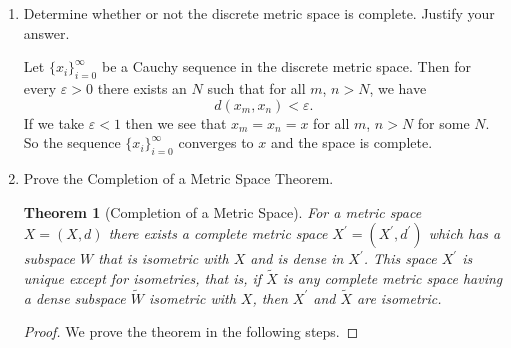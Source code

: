 \documentclass[12pt]{article}
\newtheorem{thm}{Theorem}
\begin{document}
\begin{enumerate}
\begin{mybox}
    \vspace*{3mm}
    Now, for every $g\in C[0,1]$, we have
    $$d(f_n,g)=\int_{-1}^1{|f_n(t) - g(t)|} dt
    = \int_{-1}^{-\frac{1}{n}}{|-1-g(t)|dt}
    + \int_{-\frac{1}{n}}^{\frac{1}{n}}
    {|f_n(t)-g(t)|dt}
    + \int_{{\frac{1}{n}}}^1{|1-g(t)|dt}$$
    Since $d\geq 0$ for all $g\in C[0,1]$,
    $d(f_n,g)\to 0$ implies that each
    integral on the right should also approach
    0. Then we should have
    $$g(t)=-1\ \ \text{ for }t\in [-1,0)
    \ \ \text{ and }\ \
    g(t)=1\ \ \text{ for }t\in (0,1].$$
    But then $g$ cannot be continuous so we have
    a contradiction. So, the Cauchy sequence
    $\{f_n\}_1^\infty$ does not converge in
    $C[0,1]$ and the space is not complete.
\end{mybox}
 
\item Determine whether or not the discrete metric
    space is complete. Justify your answer.
\begin{mybox}

    Let $\{x_i\}_{i=0}^\infty$ be a Cauchy
    sequence in the discrete metric space. Then
    for every $\varepsilon>0$ there exists an $N$
    such that for all $m$, $n>N$, we have
    $$d(x_m,x_n)<\varepsilon.$$
    If we take $\varepsilon<1$ then we see that
    $x_m=x_n=x$ for all $m$, $n>N$ for some $N$.
    So the sequence $\{x_i\}_{i=0}^\infty$
    converges to $x$ and the space is
    complete.
\end{mybox}
 
\item Prove the Completion of a Metric Space Theorem. 
\begin{mybox}

    \begin{thm}[Completion of a Metric Space]

    For a metric space $X = (X, d)$ there
    exists a complete metric space $X^\prime
    =(X^\prime, d^\prime)$
    which has a subspace $W$ that is
    isometric with $X$ and is dense in $X^\prime$.
    This space $X^\prime$ is unique except for
    isometries, that is, if $\tilde{X}$ is
    any complete metric space having a dense
    subspace $\tilde{W}$ isometric with $X$,
    then $X^\prime$ and
    $\tilde{X}$ are isometric.
    \end{thm}

    \begin{proof}
        We prove the theorem in the following steps.


\end{proof}
\end{mybox}
\end{enumerate}
\end{document}
